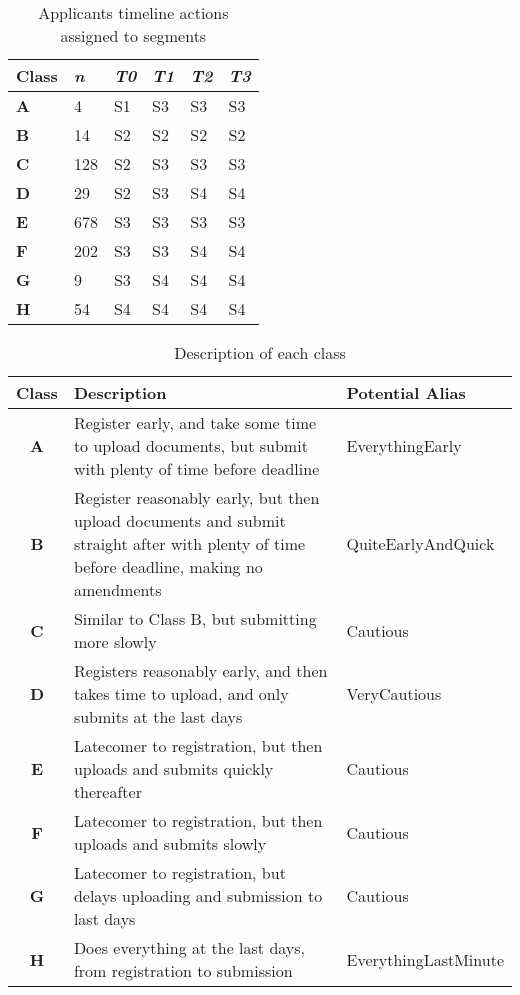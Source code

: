 \documentclass[letterpaper]{article}
\begin{document}
\begin{table}[!ht]
\centering
\begin{tabularx}{\columnwidth}{Y Y Y Y Y Y}
\hline
Class & {\emph{n}} & {\emph{T0}} & {\emph{T1}} & {\emph{T2}} & {\emph{T3}} \\ 
\hline
{\textbf{A}} & 4 & S1 & S3 & S3 & S3\\
{\textbf{B}} & 14 & S2 & S2 & S2 & S2\\
{\textbf{C}} & 128 & S2 & S3 & S3 & S3\\
{\textbf{D}} & 29 & S2 & S3 & S4 & S4\\
{\textbf{E}} & 678 & S3 & S3 & S3 & S3\\
{\textbf{F}} & 202 & S3 & S3 & S4 & S4\\
{\textbf{G}} & 9 & S3 & S4 & S4 & S4\\
{\textbf{H}} & 54 & S4 & S4 & S4 & S4\\
\hline
\end{tabularx}
\caption{Applicants timeline actions assigned to segments}
\label{tbl:apptlseg}
\end{table}

\begin{table}[!ht]
\centering
\begin{tabularx}{\columnwidth}{c X l}
\hline
Class & Description & Potential Alias  \\ 
\hline
{\textbf{A}} & Register early, and take some time to upload documents, but submit with plenty of time before deadline & EverythingEarly\\
{\textbf{B}} & Register reasonably early, but then upload documents and submit straight after with plenty of time before deadline, making no amendments & QuiteEarlyAndQuick\\
{\textbf{C}} & Similar to Class B, but submitting more slowly & Cautious\\
{\textbf{D}} & Registers reasonably early, and then takes time to upload, and only submits at the last days & VeryCautious\\
{\textbf{E}} & Latecomer to registration, but then uploads and submits
quickly thereafter & Cautious\\
{\textbf{F}} & Latecomer to registration, but then uploads and submits
slowly & Cautious\\
{\textbf{G}} & Latecomer to registration, but delays uploading and
submission to last days & Cautious\\
{\textbf{H}} & Does everything at the last days, from registration to submission & EverythingLastMinute\\
\hline
\end{tabularx}
\caption{Description of each class}
\label{tbl:classdesc}
\end{table}
\end{document}
